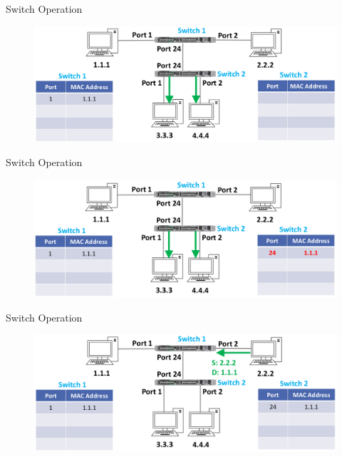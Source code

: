 \documentclass[pdflatex,compress,mathserif]{beamer}
\begin{document}
\begin{frame}{Switch Operation}
	\begin{figure}
		\centering
		\includegraphics[width=\linewidth]{img/img15}
	\end{figure}
\end{frame}

\begin{frame}{Switch Operation}
	\begin{figure}
		\centering
		\includegraphics[width=\linewidth]{img/img16}
	\end{figure}
\end{frame}

\begin{frame}{Switch Operation}
	\begin{figure}
		\centering
		\includegraphics[width=\linewidth]{img/img17}
	\end{figure}
\end{frame}
\end{document}
